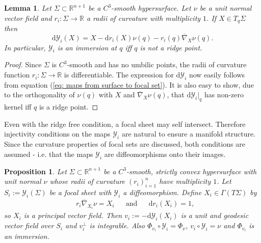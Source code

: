 \documentclass[12pt]{amsart}
\theoremstyle{plain}
\newtheorem{Lem}{Lemma}
\newtheorem{Prop}{Proposition}
\theoremstyle{definition}
\def\R{\mathbb{R}}
\newcommand{\td}{\mathrm{d}}
\numberwithin{equation}{section}
\begin{document}
\begin{Lem}\label{lem: dY_i is injective iff no ridge}
    Let $\Sigma\subset\R^{n+1}$ be a $C^3$-smooth hypersurface. Let $\nu$ be a unit normal vector field and $r_i:\Sigma\to\R$ a radii of curvature with multiplicity $1$. If $X\in T_q\Sigma$ then
    \begin{equation}
        \td\mathcal{Y}_i(X)=X-\td r_i(X)\nu(q)-r_i(q)\overline{\nabla}_X\nu(q).
    \end{equation}
    In particular, $\mathcal{Y}_i$ is an immersion at $q$ iff $q$ is not a ridge point.
\end{Lem}
\begin{proof}
    Since $\Sigma$ is $C^3$-smooth and has no umbilic points, the radii of curvature function  $r_i:\Sigma\to \R$ is differentiable. The expression for $\td\mathcal{Y}_i$ now easily follows from equation (\ref{eq: maps from surface to focal set}). It is also easy to show, due to the orthogonality of $\nu(q)$ with $X$ and $\overline{\nabla}_X\nu(q)$, that $\td\mathcal{Y}_i|_q$ has non-zero kernel iff $q$ is a ridge point.
    \end{proof}
Even with the ridge free condition, a focal sheet may self intersect. Therefore injectivity conditions on the maps $\mathcal{Y}_i$ are natural to ensure a manifold structure. Since the curvature properties of focal sets are discussed, both conditions are assumed - i.e. that the maps $\mathcal{Y}_i$ are diffeomorphisms onto their images.
\begin{Prop}\label{prop: orthogonal hypersurface gives focal sets hypersurface folliation}
    Let $\Sigma\subset \R^{n+1}$ be a $C^3$-smooth, strictly convex hypersurface with unit normal $\nu$ whose radii of curvature $(r_i)_{i=1}^n$ have multiplicity $1$. Let $S_i:=\mathcal{Y}_i(\Sigma)$ be a focal sheet with $\mathcal{Y}_i$ a diffeomorphism. Define $X_i\in\Gamma(T\Sigma)$ by
    \begin{align*}
       &r_i\overline{\nabla}_{X_i}\nu =X_i &&\text{and} &&\td r_i(X_i)=1,
    \end{align*}
    so $X_i$ is a principal vector field. Then $v_i:=-\td\mathcal{Y}_i(X_i)$ is a unit and geodesic vector field over $S_i$ and $v_i^\perp$ is integrable. Also $\Phi_{v_i}\circ\mathcal{Y}_i=\Phi_\nu$, $v_i\circ\mathcal{Y}_i=\nu$ and $\Phi_{v_i}$ is an immersion.
\end{Prop}
\end{document}
